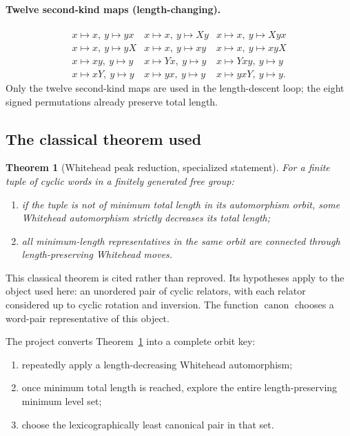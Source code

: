 \documentclass[11pt]{article}
\newtheorem{theorem}{Theorem}[section]
\theoremstyle{definition}
\theoremstyle{remark}
\newcommand{\canon}{\operatorname{canon}}
\begin{document}
\paragraph{Twelve second-kind maps (length-changing).}
\[
\begin{array}{lll}
x\mapsto x,\ y\mapsto yx &
x\mapsto x,\ y\mapsto Xy &
x\mapsto x,\ y\mapsto Xyx \\
x\mapsto x,\ y\mapsto yX &
x\mapsto x,\ y\mapsto xy &
x\mapsto x,\ y\mapsto xyX \\
x\mapsto xy,\ y\mapsto y &
x\mapsto Yx,\ y\mapsto y &
x\mapsto Yxy,\ y\mapsto y \\
x\mapsto xY,\ y\mapsto y &
x\mapsto yx,\ y\mapsto y &
x\mapsto yxY,\ y\mapsto y.
\end{array}
\]
Only the twelve second-kind maps are used in the length-descent loop; the eight
signed permutations already preserve total length.

\subsection{The classical theorem used}

\begin{theorem}[Whitehead peak reduction, specialized statement]
\label{thm:whitehead}
For a finite tuple of cyclic words in a finitely generated free group:
\begin{enumerate}
  \item if the tuple is not of minimum total length in its automorphism
  orbit, some Whitehead automorphism strictly decreases its total length;
  \item all minimum-length representatives in the same orbit are connected
  through length-preserving Whitehead moves.
\end{enumerate}
\end{theorem}

This classical theorem is cited rather than reproved.  Its hypotheses apply
to the object used here: an unordered pair of cyclic relators, with each
relator considered up to cyclic rotation and inversion.  The function
\(\canon\) chooses a word-pair representative of this object.

The project converts Theorem~\ref{thm:whitehead} into a complete orbit key:
\begin{enumerate}
  \item repeatedly apply a length-decreasing Whitehead automorphism;
  \item once minimum total length is reached, explore the entire
  length-preserving minimum level set;
  \item choose the lexicographically least canonical pair in that set.
\end{enumerate}
\end{document}
